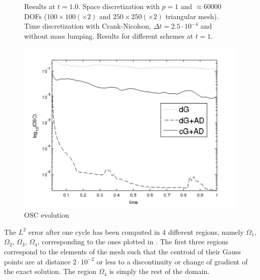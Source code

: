 \begin{figure}
\caption{ Results at $t = 1.0$. Space discretization with $p=1$ and $\approx 60000$ DOFs ($100\times 100 (\times 2)$ and $250\times 250 (\times 2)$ triangular mesh). Time discretization with Crank-Nicolson, $\Delta t = 2.5 \cdot 10^{-4}$ and without mass lumping. Results for different schemes at $t = 1 $.}\label{fig-triangle1}
\end{figure}

\begin{figure}
\centering
\includegraphics[clip=true, width=12cm]{Figures/paper2/20_3body_OSC.pdf}
\caption{OSC evolution}\label{fig-osc}
\end{figure}
The $L^2$ error after one cycle has been computed in $4$ different regions, namely $\Omega_1$, $\Omega_2$, $\Omega_3$, $\Omega_4$, corresponding to the ones plotted in . { The first three regions correspond to the elements of the mesh such that the centroid of their Gauss points are at distance $2\cdot 10^{-2}$ or less to a discontinuity or change of gradient of the exact solution. The region $\Omega_4$ is simply the rest of the domain.} 

